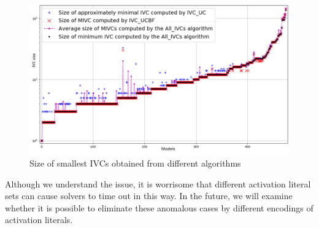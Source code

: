  \begin{figure}
 \centering
  \includegraphics[width=\textwidth]{figs/min.jpg}
  \vspace{-0.2in}
  \caption{Size of smallest IVCs obtained from different algorithms}
  \label{fig:min}
  \vspace{-0.2in}
\end{figure}

Although we understand the issue, it is worrisome that different activation literal sets can cause solvers to time out in this way.  In the future, we will examine whether it is possible to eliminate these anomalous cases by different encodings of activation literals. 